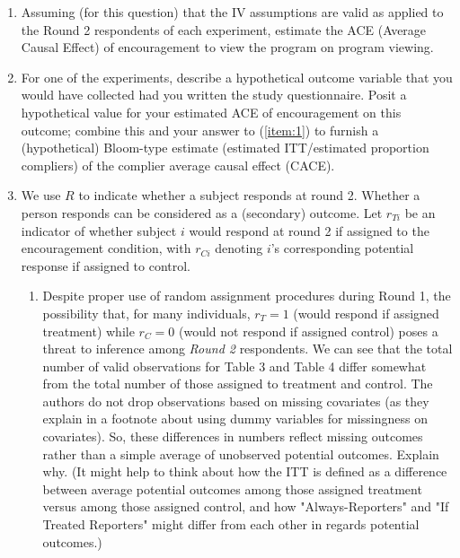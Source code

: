 \documentclass{article}
\begin{document}
\begin{enumerate}
\item \label{item:1}Assuming (for this question) that the IV assumptions are
     valid as applied to the Round 2 respondents of each experiment, estimate
     the ACE (Average Causal Effect) of encouragement to view the program on
     program viewing.
\item For one of the experiments, describe a hypothetical outcome variable that
     you would have collected had you written the study questionnaire. Posit a
     hypothetical value for your estimated ACE of encouragement on this outcome;
     combine this and your answer to (\ref{item:1}) to furnish a (hypothetical)
     Bloom-type estimate (estimated ITT/estimated proportion compliers) of the
     complier average causal effect (CACE).

\item We use $R$ to indicate whether a subject responds at round 2. Whether a
	person responds can be considered as a (secondary) outcome. Let
	$r_{Ti}$ be an indicator of whether subject $i$ would respond at round
	2 if assigned to the encouragement condition, with $r_{Ci}$ denoting
	$i$'s corresponding potential response if assigned to control.

     \begin{enumerate}

  \item Despite proper use of random assignment procedures during Round 1, the
	  possibility that, for many individuals, $r_{T}=1$ (would respond if
	  assigned treatment) while $r_{C}=0$ (would not respond if assigned
	  control) poses a threat to inference among \textit{Round 2}
	  respondents. We can see that the total number of valid observations
	  for Table 3 and Table 4 differ somewhat from the total number of
	  those assigned to treatment and control. The authors do not drop
	  observations based on missing covariates (as they explain in a
	  footnote about using dummy variables for missingness on covariates).
	  So, these differences in numbers reflect missing outcomes rather than
	  a simple average of unobserved potential outcomes. Explain why. (It
	  might help to think about how the ITT is defined as a difference
	  between average potential outcomes among those assigned treatment
	  versus among those assigned control, and how  "Always-Reporters" and
	  "If Treated Reporters" might differ from each other in regards
	  potential outcomes.)


\end{enumerate}
\end{enumerate}
\end{document}
